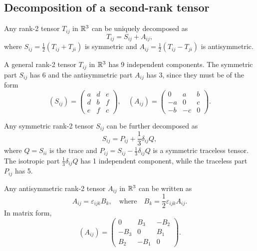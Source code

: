 \documentclass[a4paper]{article}
\begin{document}
\subsection{Decomposition of a second-rank tensor}

\begin{prop}
  Any rank-2 tensor $T_{ij}$ in $\mathbb{R}^3$ can be uniquely decomposed as
  \[
    T_{ij} = S_{ij} + A_{ij},
  \]
  where $S_{ij} = \frac{1}{2}(T_{ij} + T_{ji})$ is symmetric and $A_{ij} = \frac{1}{2}(T_{ij} - T_{ji})$ is antisymmetric.
\end{prop}

\begin{rmk}
  A general rank-2 tensor $T_{ij}$ in $\mathbb{R}^3$ has 9 independent components. The symmetric part $S_{ij}$ has 6 and the antisymmetric part $A_{ij}$ has 3, since they must be of the form
  \[
    (S_{ij}) =
    \begin{pmatrix}
      a & d & e\\
      d & b & f\\
      e & f & c
    \end{pmatrix}
    ,\quad
    (A_{ij}) =
    \begin{pmatrix}
      0 & a & b\\
      -a & 0 & c\\
      -b & -c & 0
    \end{pmatrix}.
  \]
\end{rmk}

\begin{prop}
  Any symmetric rank-2 tensor $S_{ij}$ can be further decomposed as
  \[
    S_{ij} = P_{ij} + \frac{1}{3}\delta_{ij} Q,
  \]
  where $Q = S_{ii}$ is the trace and $P_{ij} = S_{ij} - \frac{1}{3}\delta_{ij}Q$ is a symmetric traceless tensor. The isotropic part $\frac{1}{3}\delta_{ij}Q$ has 1 independent component, while the traceless part $P_{ij}$ has 5.
\end{prop}

\begin{prop}
  Any antisymmetric rank-2 tensor $A_{ij}$ in $\mathbb{R}^3$ can be written as
  \[
    A_{ij} = \varepsilon_{ijk}B_k, \quad\text{where}\quad B_k = \frac{1}{2}\varepsilon_{ijk}A_{ij}.
  \]
  In matrix form,
  \[
    (A_{ij}) =
    \begin{pmatrix}
      0 & B_3 & -B_2\\
      -B_3 & 0 & B_1\\
      B_2 & -B_1 & 0
    \end{pmatrix}.
  \]
\end{prop}
\end{document}
